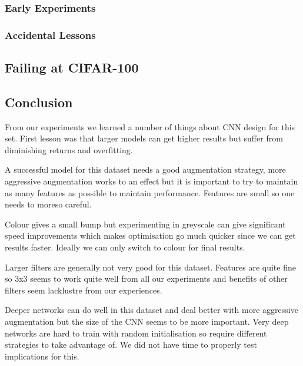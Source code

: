 \subsubsection{Early Experiments}

\subsubsection{Accidental Lessons}

\subsection{Failing at CIFAR-100}

\subsection{Conclusion}
From our experiments we learned a number of things about CNN design for this set. First lesson was that larger models can get higher results but suffer from diminishing returns and overfitting.

A successful model for this dataset needs a good augmentation strategy, more aggressive augmentation works to an effect but it is important to try to maintain as many features as possible to maintain performance. Features are small so one needs to moreso careful.

Colour gives a small bump but experimenting in greyscale can give significant speed improvements which makes optimisation go much quicker since we can get results faster. Ideally we can only switch to colour for final results.

Larger filters are generally not very good for this dataset. Features are quite fine so 3x3 seems to work quite well from all our experiments and benefits of other filters seem lacklustre from our experiences.

Deeper networks can do well in this dataset and deal better with more aggressive augmentation but the size of the CNN seems to be more important. Very deep networks are hard to train with random initialisation so require different strategies to take advantage of. We did not have time to properly test implications for this.
